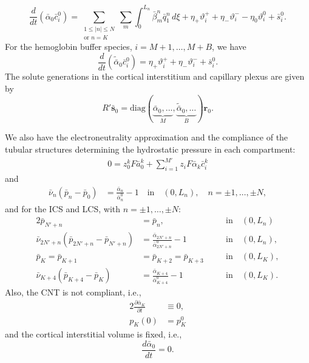 \documentclass{article}
\begin{document}
\begin{equation}
    \frac{d}{d t}(\bar{\alpha}_0 \bar{c}_i^0) =  
        \sum_{\substack{1\leq|n|\leq N\\\text{or } n=K}}\sum_m\int_0^{L_n}\bar{\beta}_m^n\bar{q}_{1}^n\,d\xi+\eta_+\vartheta_i^+ + \eta_-\vartheta_i^- -\eta_0\vartheta_i^0+\bar{s}_i^0.
\end{equation}
For the hemoglobin buffer species, $i=M+1,\dots,M+B$, we have
\begin{equation}
    \frac{d}{d t}(\tilde{\bar{\alpha}}_0 \bar{c}_i^0) = 
    \eta_+\vartheta_i^++\eta_-\vartheta_i^-+\bar{s}_i^0.
\end{equation}
The solute generations in the cortical interstitium and capillary plexus are given by
\begin{equation}
    R'\bar{\mathbf{s}}_0 = \mathrm{diag}(\underbrace{\bar{\alpha}_0,...}_{M},\underbrace{\tilde{\bar{\alpha}}_0,\dots}_B)\mathbf{r}_0.
\end{equation}

We also have the electroneutrality approximation and the compliance of the tubular structures determining the hydrostatic pressure in each compartment:
\begin{gather}
    0=z_0^k F\bar{a}_0^k+\sum_{i=1}^{M'}z_iF\bar{\alpha}_k \bar{c}_i^k
\end{gather}
and
\begin{align}
    \bar{\nu}_n(\bar{p}_n - \bar{p}_0) &= \frac{\bar{\alpha}_n}{\bar{\alpha}_n^0}-1\quad\text{in}\quad (0,L_n), \quad n=\pm 1,\dots,\pm N,
\end{align}
and for the ICS and LCS, with $n=\pm 1,\dots,\pm N$:
\begin{alignat}{2}
    \bar{p}_{N'+n} &= \bar{p}_n,\quad &&\text{in}\quad (0,L_n) \\ 
    \bar{\nu}_{2N'+n}(\bar{p}_{2N'+n} - \bar{p}_{N'+n}) &= \frac{\bar{\alpha}_{2N'+n}}{\bar{\alpha}_{2N'+n}^0}-1\quad &&\text{in}\quad (0,L_n),\\
    \bar{p}_K=\bar{p}_{K+1}&=\bar{p}_{K+2}=\bar{p}_{K+3}\quad &&\text{in}\quad (0,L_K),\\
    \bar{\nu}_{K+4}(\bar{p}_{K+4} - \bar{p}_{K}) &= \frac{\bar{\alpha}_{K+4}}{\bar{\alpha}_{K+4}^0}-1\quad &&\text{in}\quad (0,L_K).
\end{alignat}
Also, the CNT is not compliant, i.e.,
\begin{alignat}{2}
    \frac{\partial\bar{\alpha}_K}{\partial t}&\equiv 0,\\
    p_K(0) &= p_K^0
\end{alignat}
and the cortical interstitial volume is fixed, i.e., 
\begin{equation}
    \frac{d \bar{\alpha}_0}{dt} = 0.
\end{equation}
\end{document}

